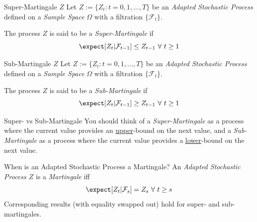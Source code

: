 \documentclass[11pt,a4paper]{article}
\begin{document}
  \begin{definition}{Super-Martingale $Z$}
    Let $Z:=\{Z_t:t=0,1,\dots,T\}$ be an \textit{Adapted Stochastic Process} defined on a \textit{Sample Space} $\Omega$ with a filtration $\{\mathcal{F}_t\}$.
    \par The process $Z$ is said to be a \textit{Super-Martingale} if
    \[ \expect[Z_t|\mathcal{F}_{t-1}]\leq Z_{t-1}\ \forall\ t\geq1 \]
  \end{definition}

  \begin{definition}{Sub-Martingale $Z$}
    Let $Z:=\{Z_t:t=0,1,\dots,T\}$ be an \textit{Adapted Stochastic Process} defined on a \textit{Sample Space} $\Omega$ with a filtration $\{\mathcal{F}_t\}$.
    \par The process $Z$ is said to be a \textit{Sub-Martingale} if
    \[ \expect[Z_t|\mathcal{F}_{t-1}]\geq Z_{t-1}\ \forall\ t\geq1 \]
  \end{definition}

  \begin{remark}{Super- vs Sub-Martingale}
    You should think of a \textit{Super-Martingale} as a process where the current value provides an \underline{upper}-bound on the next value, and a \textit{Sub-Martingale} as a process where the current value provides a \underline{lower}-bound on the next value.
  \end{remark}

  \begin{theorem}{When is an Adapted Stochastic Process a Martingale?}\label{the_adapted_stochastic_process_and_martingales}
    An \textit{Adapted Stochastic Process $Z$} is a \textit{Martingale} iff
    \[ \expect[Z_t|\mathcal{F}_s]=Z_s\ \forall\ t\geq s \]
    Corresponding results (with equality swapped out) hold for super- and sub-martingales.
  \end{theorem}
\end{document}
